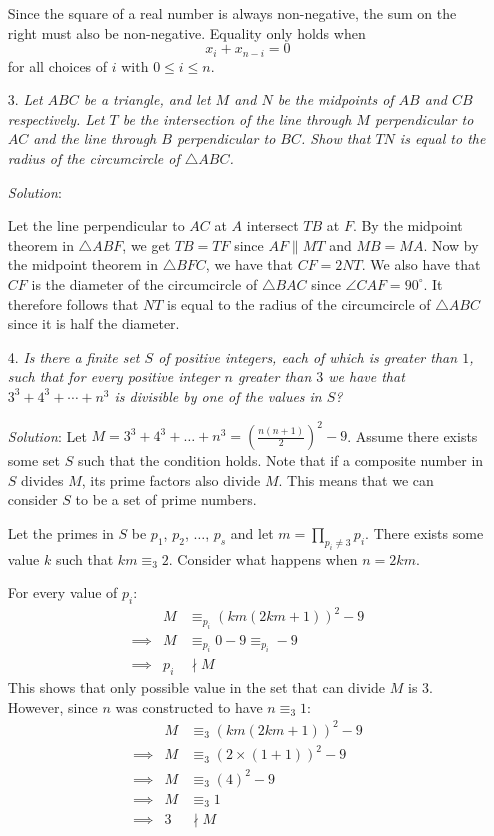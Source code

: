 \documentclass{article}
\begin{document}
\begin{enumerate}
Since the square of a real number is always non-negative, the sum on the right must also be non-negative.
Equality only holds when
$$x_i + x_{n-i} = 0$$
for all choices of $i$ with $0 \le i \le n$.


\item[3.] %
\textit{Let $ABC$ be a triangle, and let $M$ and $N$ be the midpoints of $AB$ and $CB$ respectively.
Let $T$ be the intersection of the line through $M$ perpendicular to $AC$ and the line through $B$ perpendicular to $BC$.
Show that $TN$ is equal to the radius of the circumcircle of $\triangle ABC$.}

\textit{Solution}:

Let the line perpendicular to $AC$ at $A$ intersect $TB$ at $F$.
By the midpoint theorem in $\triangle ABF$, we get $TB=TF$ since $AF\parallel MT$ and $MB=MA$.
Now by the midpoint theorem in $\triangle BFC$, we have that $CF=2NT$.
We also have that $CF$ is the diameter of the circumcircle of $\triangle BAC$ since $\angle CAF=90^\circ$.
It therefore follows that $NT$ is equal to the radius of the circumcircle of $\triangle ABC$ since it is half the diameter.


\item[4.] %
\textit{Is there a finite set $S$ of positive integers, each of which is greater than $1$, such that for every positive integer $n$ greater than $3$ we have that $3^3 +4^3 +\dotsb +n^3$ is divisible by one of the values in $S$?}

\textit{Solution}:
Let $M = 3^3 + 4^3 + \dots + n^3 = \left(\frac{n(n + 1)}{2}\right)^2 - 9$.
Assume there exists some set $S$ such that the condition holds.
Note that if a composite number in $S$ divides $M$, its prime factors also divide $M$.
This means that we can consider $S$ to be a set of prime numbers.

Let the primes in $S$ be $p_1$, $p_2$, $\dots$, $p_s$ and let $m = \prod_{p_i \neq 3}p_i$.
There exists some value $k$ such that $km \equiv _3 2$.
Consider what happens when $n = 2km$.

For every value of $p_i$:
\begin{align*}
  && M &\equiv _{p_i} (km(2km + 1))^2 - 9 \\
  &\implies& M &\equiv _{p_i} 0 - 9 \equiv_{p_i} -9 \\
  &\implies& p_i &\nmid M &
\end{align*}
This shows that only possible value in the set that can divide $M$ is $3$.
However, since $n$ was constructed to have $n \equiv _3 1$:
\begin{align*}
  &&M &\equiv _3 (km(2km + 1))^2 - 9 \\
  &\implies& M &\equiv _3 (2 \times (1 + 1))^2 - 9 \\
  &\implies& M &\equiv _3 (4)^2 - 9 \\
  &\implies& M &\equiv _3 1 \\
  &\implies& 3 &\nmid M &
\end{align*}


\end{enumerate}
\end{document}
